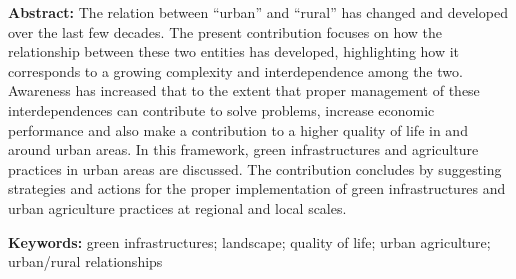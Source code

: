 \documentclass[10pt,a4paper]{article}
\begin{document}
\textbf{{\color{LibrelloColor}Abstract:}} The relation between ``urban'' and ``rural'' has changed and developed over the last few decades. The present contribution focuses on how the relationship between these two entities has developed, highlighting how it corresponds to a growing complexity and interdependence among the two. Awareness has increased that to the extent that proper management of these interdependences can contribute to solve problems, increase economic performance and also make a contribution to a higher quality of life in and around urban areas. In this framework, green infrastructures and agriculture practices in urban areas are discussed. The contribution concludes by suggesting strategies and actions for the proper implementation of green infrastructures and urban agriculture practices at regional and local scales. 

\textbf{{\color{LibrelloColor}Keywords:}} green infrastructures; landscape; quality of life; urban agriculture; urban/rural relationships
\par\endgroup
 
\setlength{\parindent}{0.5cm}
\setlength{\parskip}{0cm}
\setlength{\bibsep}{0cm}

\vspace*{10mm}
\end{document}
